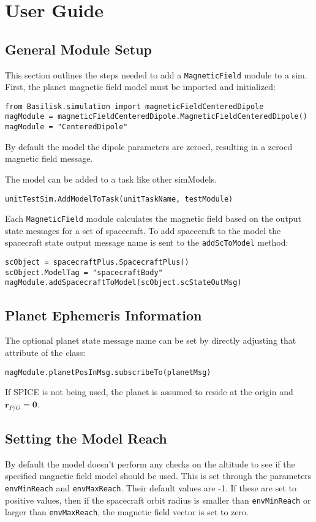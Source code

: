 
\section{User Guide}

\subsection{General Module Setup}
This section outlines the steps needed to add a {\tt MagneticField} module to a sim.
First, the planet magnetic field model must be imported and initialized:
\begin{verbatim}
from Basilisk.simulation import magneticFieldCenteredDipole
magModule = magneticFieldCenteredDipole.MagneticFieldCenteredDipole()
magModule = "CenteredDipole"
\end{verbatim}
By default the model the dipole parameters are zeroed, resulting in a zeroed magnetic field message. 

The model can  be added to a task like other simModels. 
\begin{verbatim}
unitTestSim.AddModelToTask(unitTaskName, testModule)
\end{verbatim}

Each {\tt MagneticField} module calculates the magnetic field based on the output state messages for a set of spacecraft.
To add spacecraft to the model the spacecraft state output message name is sent to the \verb|addScToModel| method:
\begin{verbatim}
scObject = spacecraftPlus.SpacecraftPlus()
scObject.ModelTag = "spacecraftBody"
magModule.addSpacecraftToModel(scObject.scStateOutMsg)
\end{verbatim}

\subsection{Planet Ephemeris Information}
The optional planet state message name can be set by directly adjusting that attribute of the class:
\begin{verbatim}
magModule.planetPosInMsg.subscribeTo(planetMsg)
\end{verbatim}
If SPICE is not being used, the planet is assumed to reside at the origin and $\bm r_{P/O} = \bm 0$.

\subsection{Setting the Model Reach}
By default the model doesn't perform any checks on the altitude to see if the specified magnetic field model should be used.  This is set through the parameters {\tt envMinReach} and {\tt envMaxReach}.  Their default values are -1.  If these are set to positive values, then if the spacecraft orbit radius is smaller than {\tt envMinReach} or larger than {\tt envMaxReach}, the magnetic field vector is set to zero.



